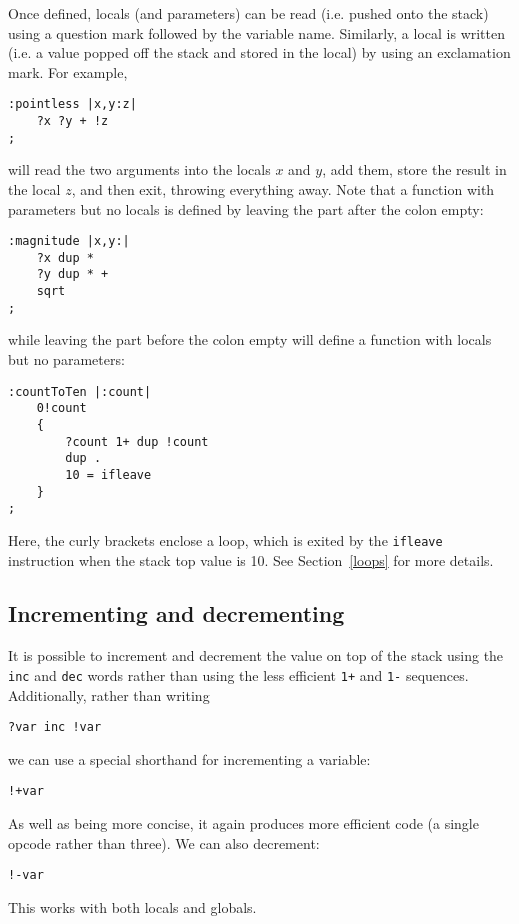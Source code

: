 Once defined, locals (and parameters) can be read (i.e. pushed onto
the stack) using a question mark followed by the variable name.
Similarly, a local is written (i.e. a value popped off the stack and
stored in the local) by using an exclamation mark. For example,
\begin{lstlisting}
:pointless |x,y:z|
    ?x ?y + !z
;
\end{lstlisting}
will read the two arguments into the locals $x$ and $y$, add them,
store the result in the local $z$, and then exit, throwing everything away.
Note that a function with parameters but no locals is defined by leaving
the part after the colon empty:
\begin{lstlisting}
:magnitude |x,y:|
    ?x dup *
    ?y dup * +
    sqrt
;
\end{lstlisting}
while leaving the part before the colon empty will define a function with
locals but no parameters:
\begin{lstlisting}
:countToTen |:count|
    0!count
    {
        ?count 1+ dup !count
        dup .
        10 = ifleave
    }
;
\end{lstlisting}
Here, the curly brackets enclose a loop, which is exited by the
\texttt{ifleave} instruction when the stack top value is 10. See
Section~\ref{loops} for more details.

\subsection{Incrementing and decrementing}
It is possible to increment and decrement the value on top of the stack
using the \texttt{inc} and \texttt{dec} words rather than using
the less efficient \texttt{1+} and \texttt{1-} sequences.
Additionally, rather than writing
\begin{lstlisting}
?var inc !var
\end{lstlisting}
we can use a special shorthand for incrementing a variable:
\begin{lstlisting}
!+var
\end{lstlisting}
As well as being more concise, it again produces more efficient code
(a single opcode rather than three). We can
also decrement:
\begin{lstlisting}
!-var
\end{lstlisting}
This works with both locals and globals.

